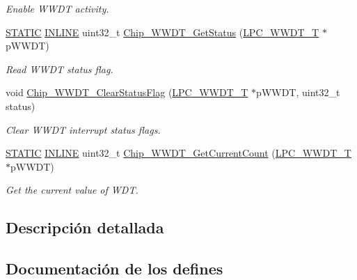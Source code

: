 \begin{DoxyCompactItemize}
\begin{DoxyCompactList}\small\item\em Enable W\+W\+DT activity. \end{DoxyCompactList}\item 
\hyperlink{group___l_p_c___types___public___macros_ga10b2d890d871e1489bb02b7e70d9bdfb}{S\+T\+A\+T\+IC} \hyperlink{spifi__18xx__43xx_8h_a2eb6f9e0395b47b8d5e3eeae4fe0c116}{I\+N\+L\+I\+NE} uint32\+\_\+t \hyperlink{group___w_w_d_t__18_x_x__43_x_x_ga9e5a34151326049c5485bb20c9f36fee}{Chip\+\_\+\+W\+W\+D\+T\+\_\+\+Get\+Status} (\hyperlink{struct_l_p_c___w_w_d_t___t}{L\+P\+C\+\_\+\+W\+W\+D\+T\+\_\+T} $\ast$p\+W\+W\+DT)
\begin{DoxyCompactList}\small\item\em Read W\+W\+DT status flag. \end{DoxyCompactList}\item 
void \hyperlink{group___w_w_d_t__18_x_x__43_x_x_ga6e6453450170638f554e7ba3c548ec4a}{Chip\+\_\+\+W\+W\+D\+T\+\_\+\+Clear\+Status\+Flag} (\hyperlink{struct_l_p_c___w_w_d_t___t}{L\+P\+C\+\_\+\+W\+W\+D\+T\+\_\+T} $\ast$p\+W\+W\+DT, uint32\+\_\+t status)
\begin{DoxyCompactList}\small\item\em Clear W\+W\+DT interrupt status flags. \end{DoxyCompactList}\item 
\hyperlink{group___l_p_c___types___public___macros_ga10b2d890d871e1489bb02b7e70d9bdfb}{S\+T\+A\+T\+IC} \hyperlink{spifi__18xx__43xx_8h_a2eb6f9e0395b47b8d5e3eeae4fe0c116}{I\+N\+L\+I\+NE} uint32\+\_\+t \hyperlink{group___w_w_d_t__18_x_x__43_x_x_ga4b1c8d2f48a8397d63c1c3c74dc7e82a}{Chip\+\_\+\+W\+W\+D\+T\+\_\+\+Get\+Current\+Count} (\hyperlink{struct_l_p_c___w_w_d_t___t}{L\+P\+C\+\_\+\+W\+W\+D\+T\+\_\+T} $\ast$p\+W\+W\+DT)
\begin{DoxyCompactList}\small\item\em Get the current value of W\+DT. \end{DoxyCompactList}\end{DoxyCompactItemize}


\subsection{Descripción detallada}


\subsection{Documentación de los \textquotesingle{}defines\textquotesingle{}}
